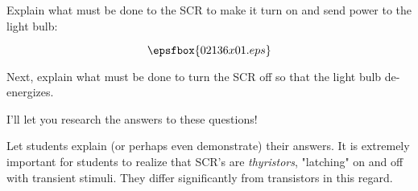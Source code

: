 

Explain what must be done to the SCR to make it turn on and send power to the light bulb:

$$\epsfbox{02136x01.eps}$$

Next, explain what must be done to turn the SCR off so that the light bulb de-energizes.







I'll let you research the answers to these questions!







Let students explain (or perhaps even demonstrate) their answers.  It is extremely important for students to realize that SCR's are {\it thyristors}, "latching" on and off with transient stimuli.  They differ significantly from transistors in this regard.




